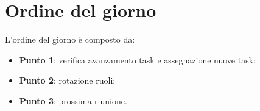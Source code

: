 \section{Ordine del giorno}
L'ordine del giorno è composto da:
\begin{itemize}
	\item \textbf{Punto 1}: verifica avanzamento task e assegnazione nuove task;
	\item \textbf{Punto 2}: rotazione ruoli;
	\item \textbf{Punto 3}: prossima riunione.
\end{itemize}